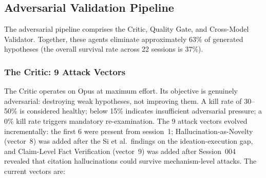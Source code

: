 \subsection{Adversarial Validation Pipeline}
\label{sec:adversarial}

The adversarial pipeline comprises the Critic, Quality Gate, and Cross-Model Validator. Together, these agents eliminate approximately 63\% of generated hypotheses (the overall survival rate across 22 sessions is 37\%).

\subsubsection{The Critic: 9 Attack Vectors}

The Critic operates on Opus at maximum effort. Its objective is genuinely adversarial: destroying weak hypotheses, not improving them. A kill rate of 30--50\% is considered healthy; below 15\% indicates insufficient adversarial pressure; a 0\% kill rate triggers mandatory re-examination. The 9 attack vectors evolved incrementally: the first 6 were present from session~1; Hallucination-as-Novelty (vector~8) was added after the Si et al.\ findings on the ideation-execution gap, and Claim-Level Fact Verification (vector~9) was added after Session~004 revealed that citation hallucinations could survive mechanism-level attacks. The current vectors are:

